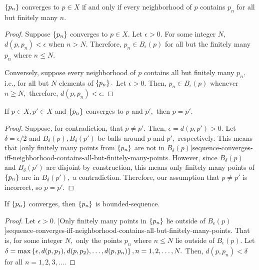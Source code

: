 \documentclass{article}
\begin{document}
\begin{theorem}\label{sequence-converges-iff-neighborhood-contains-all-but-finitely-many-points}
$\left\{ p_n \right\}$ converges to $p \in X$ if and only if every \@{neighborhood} of $p$ contains $p_n$ for all but finitely many $n.$
\end{theorem}

\begin{proof}
Suppose $\left\{ p_n \right\}$ \@{converges} to $p \in X.$ Let $\epsilon > 0.$ For some \@{integer} $N,$ $d(p, p_n) < \epsilon$ when $n > N.$ Therefore, $p_n \in B_\epsilon(p)$ for all but the finitely many $p_n$ where $n \leq N.$ 

Conversely, suppose every \@{neighborhood} of $p$ contains all but finitely many $p_n,$ i.e., for all but $N$ elements of $\left\{ p_n \right\}.$ Let $\epsilon > 0.$ Then, $p_n \in B_\epsilon(p)$ whenever $n \geq N,$ therefore, $d(p, p_n) < \epsilon.$
\end{proof}

\begin{theorem}\label{limits-of-sequences-are-unique}
If $p \in X, p' \in X$ and $\left\{ p_n \right\}$ converges to $p$ and $p',$ then $p = p'.$
\end{theorem}

\begin{proof}
Suppose, for contradiction, that $p \neq p'.$ Then, $\epsilon = d(p, p') > 0.$ Let $\delta = \epsilon/2$ and $B_\delta(p), B_\delta(p')$ be \@{balls} around $p$ and $p',$ respectively. This means that \@[only finitely many points from $\left\{ p_n \right\}$ are not in $B_\delta(p)$]{sequence-converges-iff-neighborhood-contains-all-but-finitely-many-points}. However, since $B_\delta(p)$ and $B_\delta(p')$ are disjoint by construction, this means only finitely many points of $\left\{ p_n \right\}$ are in $B_\delta(p'),$ a contradiction. Therefore, our assumption that $p \neq p'$ is incorrect, so $p = p'.$
\end{proof}

\begin{theorem}\label{convergent-sequences-are-bounded}
If $\left\{ p_n \right\}$ \@{converges}, then $\left\{ p_n \right\}$ is \@{bounded-sequence}.
\end{theorem}

\begin{proof}
Let $\epsilon > 0.$ \@[Only finitely many points in $\left\{ p_n \right\}$ lie outside of $B_\epsilon(p)$]{sequence-converges-iff-neighborhood-contains-all-but-finitely-many-points}. That is, for some \@{integer} $N,$ only the points $p_n$ where $n \leq N$ lie outside of $B_\epsilon(p).$ Let $\delta = \max\left\{ \epsilon, d(p, p_1), d(p, p_2), \dots, d(p, p_n) \right\}, n = 1, 2, \dots, N.$ Then, $d(p, p_n) < \delta$ for all $n = 1, 2, 3, \dots.$
\end{proof}
\end{document}
